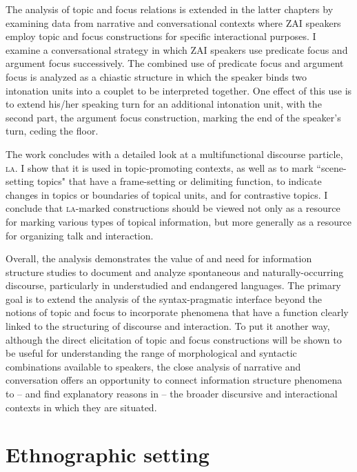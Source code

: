 The analysis of topic and focus relations is extended in the latter chapters by examining data from narrative and conversational contexts where ZAI speakers employ topic and focus constructions for specific interactional purposes. I examine a conversational strategy in which ZAI speakers use predicate focus and argument focus successively. The combined use of predicate focus and argument focus is analyzed as a chiastic structure in which the speaker binds two intonation units into a couplet to be interpreted together. One effect of this use is to extend his/her speaking turn for an additional intonation unit, with the second part, the argument focus construction, marking the end of the speaker's turn, ceding the floor. 

The work concludes with a detailed look at a multifunctional discourse particle, \textsc{la}. I show that it is used in topic-promoting contexts, as well as to mark ``scene-setting topics" that have a frame-setting or delimiting function, to indicate changes in topics or boundaries of topical units, and for contrastive topics. I conclude that \textsc{la}-marked constructions should be viewed not only as a resource for marking various types of topical information, but more generally as a resource for organizing talk and interaction. 

Overall, the analysis demonstrates the value of and need for information structure studies to document and analyze spontaneous and naturally-occurring discourse, particularly in understudied and endangered languages.  The primary goal is to extend the analysis of the syntax-pragmatic interface beyond the notions of topic and focus to incorporate phenomena that have a function clearly linked to the structuring of discourse and interaction. To put it another way, although the direct elicitation of topic and focus constructions will be shown to be useful for understanding the range of morphological and syntactic combinations available to speakers, the close analysis of narrative and conversation offers an opportunity to connect information structure phenomena to -- and find explanatory reasons in -- the broader discursive and interactional contexts in which they are situated.


\section{Ethnographic setting}

